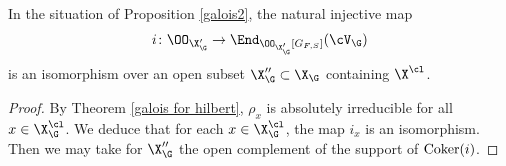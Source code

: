\begin{prop}
\notready\label{schur} In the situation of Proposition \ref{galois2},
the natural injective map
$$i\colon \OO_{\X'_{\G}}\to \End_{\OO_{\X'_{\G}}[G_{F, S}]}(\cV_{\G})$$
is an isomorphism over an open subset $\X_{\G}''\subset \X_{\G}$ containing $\X^{\cl}$.
\end{prop}
\begin{proof}
By Theorem \ref{galois for hilbert}, $\rho_{x}$ is absolutely irreducible for all $x\in \X_{\G}^{\cl}$.
We deduce that for each $x\in \X_{\G}^{\cl}$, the map
$i_{x}$ is an isomorphism. Then we may take for $\X''_{\G}$ the open complement of the support of  ${\rm Coker}(i)$.
\end{proof}






































